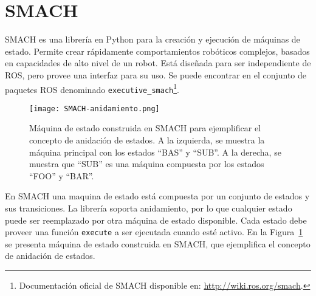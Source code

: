 \section{SMACH}

SMACH es una librería en Python para la creación y ejecución de máquinas de estado. Permite crear rápidamente comportamientos robóticos complejos, basados en capacidades de alto nivel de un robot. Está diseñada para ser independiente de ROS, pero provee una interfaz para su uso. Se puede encontrar en el conjunto de paquetes ROS denominado \texttt{executive\_smach}\footnote{Documentación oficial de SMACH disponible en: \url{http://wiki.ros.org/smach}.}.


\begin{figure}[!ht]
	\centering
	\texttt{[image: SMACH-anidamiento.png]}
	\caption[Ejemplo de máquinas de estado anidadas usando SMACH.]
	{\small Máquina de estado construida en SMACH para ejemplificar el concepto de anidación de estados. A la izquierda, se muestra la máquina principal con los estados ``BAS'' y ``SUB''. A la derecha, se muestra que ``SUB'' es una máquina compuesta por los estados ``FOO'' y ``BAR''.}
	\label{img:SMACH-sample}
\end{figure}

En SMACH una maquina de estado está compuesta por un conjunto de estados y sus transiciones. La librería soporta anidamiento, por lo que cualquier estado puede ser reemplazado por otra máquina de estado disponible. Cada estado debe proveer una función \texttt{execute} a ser ejecutada cuando esté activo. En la Figura~\ref{img:SMACH-sample} se presenta máquina de estado construida en SMACH, que ejemplifica el concepto de anidación de estados.

